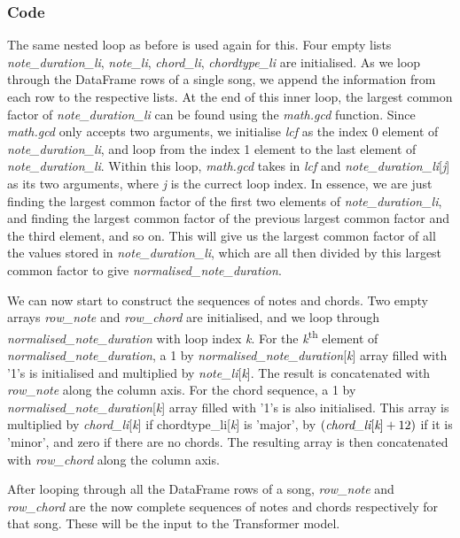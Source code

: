 \subsubsection{Code}
The same nested loop as before is used again for this. Four empty lists \emph{note\_duration\_li}, \emph{note\_li}, \emph{chord\_li}, \emph{chordtype\_li} are initialised. As we loop through the DataFrame rows of a single song, we append the information from each row to the respective lists. At the end of this inner loop, the largest common factor of \emph{note\_duration\_li} can be found using the \emph{math.gcd} function. Since \emph{math.gcd} only accepts two arguments, we initialise \emph{lcf} as the index 0 element of \emph{note\_duration\_li}, and loop from the index 1 element to the last element of \emph{note\_duration\_li}. Within this loop, \emph{math.gcd} takes in \emph{lcf} and \emph{note\_duration\_li}[\emph{j}] as its two arguments, where \emph{j} is the currect loop index. In essence, we are just finding the largest common factor of the first two elements of \emph{note\_duration\_li}, and finding the largest common factor of the previous largest common factor and the third element, and so on. This will give us the largest common factor of all the values stored in \emph{note\_duration\_li}, which are all then divided by this largest common factor to give \emph{normalised\_note\_duration}.

We can now start to construct the sequences of notes and chords. Two empty arrays \emph{row\_note} and \emph{row\_chord} are initialised, and we loop through \emph{normalised\_note\_duration} with loop index \emph{k}. For the \emph{k}\textsuperscript{th} element of \emph{normalised\_note\_duration}, a 1 by \emph{normalised\_note\_duration}[\emph{k}] array filled with '1's is initialised and multiplied by \emph{note\_li}[\emph{k}]. The result is concatenated with \emph{row\_note} along the column axis. For the chord sequence, a 1 by \emph{normalised\_note\_duration}[\emph{k}] array filled with '1's is also initialised. This array is multiplied by \emph{chord\_li}[\emph{k}] if chordtype\_li[\emph{k}] is 'major', by $(\emph{chord\_li}[\emph{k}] + 12)$ if it is 'minor', and zero if there are no chords. The resulting array is then concatenated with \emph{row\_chord} along the column axis.

After looping through all the DataFrame rows of a song, \emph{row\_note} and \emph{row\_chord} are the now complete sequences of notes and chords respectively for that song. These will be the input to the Transformer model.